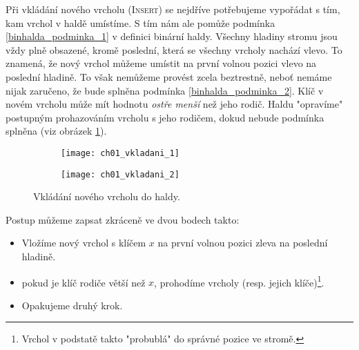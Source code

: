 Při vkládání nového vrcholu (\textsc{Insert}) se nejdříve potřebujeme vypořádat s tím, kam vrchol v haldě umístíme. S tím nám ale pomůže podmínka \ref{binhalda_podminka_1} v definici binární haldy. Všechny hladiny stromu jsou vždy plně obsazené, kromě poslední, která se všechny vrcholy nachází vlevo. To znamená, že nový vrchol můžeme umístit na první volnou pozici vlevo na poslední hladině. To však nemůžeme provést zcela beztrestně, neboť nemáme nijak zaručeno, že bude splněna podmínka \ref{binhalda_podminka_2}. Klíč v novém vrcholu může mít hodnotu \emph{ostře menší} než jeho rodič. Haldu "opravíme" postupným prohazováním vrcholu s jeho rodičem, dokud nebude podmínka splněna (viz obrázek \ref{fig:vkladani_vrcholu_halda}).
\begin{figure}[h]
    \centering
    \begin{subfigure}{7cm}
        \texttt{[image: ch01\_vkladani\_1]}
    \end{subfigure}
    \begin{subfigure}{7cm}
        \texttt{[image: ch01\_vkladani\_2]}
    \end{subfigure}
    \caption{Vkládání nového vrcholu do haldy.}
    \label{fig:vkladani_vrcholu_halda}
\end{figure}
Postup můžeme zapsat zkráceně ve dvou bodech takto:
\begin{itemize}
    \item Vložíme nový vrchol s klíčem $x$ na první volnou pozici zleva na poslední hladině.
    \item pokud je klíč rodiče větší než $x$, prohodíme vrcholy (resp. jejich klíče)\footnote{Vrchol v podstatě takto "probublá" do správné pozice ve stromě.}.
    \item Opakujeme druhý krok.
\end{itemize}